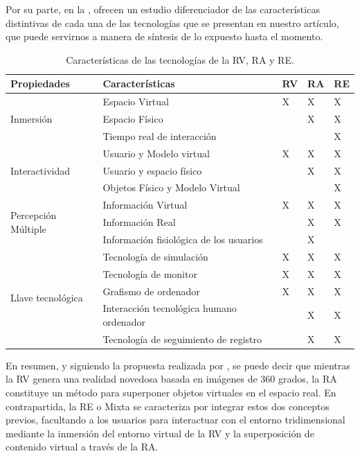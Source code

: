 \documentclass[spanish]{textolivre}
\begin{document}
Por su parte, en la , \textcite[p.~755]{ke2019enhanced} ofrecen un estudio diferenciador de las características distintivas de cada una de las tecnologías que se presentan en nuestro artículo, que puede servirnos a manera de síntesis de lo expuesto hasta el momento.

\begin{table}[htbp]
\caption{Características de las tecnologías de la RV, RA y RE.}
\label{tbl1}
\centering
\begin{tabular}{lllll}
\toprule
Propiedades & Características & RV & RA & RE \\ 
\midrule
\multirow{3}{*}{Inmersión} & Espacio Virtual & X & X & X \\ 
& Espacio Físico & & X & X \\
& Tiempo real de interacción & & & X \\
\multirow{3}{*}{Interactividad} & Usuario y Modelo virtual & X & X & X \\
& Usuario y espacio físico & & X & X \\
& Objetos Físico y Modelo Virtual & & & X \\
\multirow{3}{*}{Percepción Múltiple} & Información Virtual & X & X & X \\
& Información Real & & X & X \\
& Información fisiológica de los usuarios & & X \\
\multirow{5}{*}{Llave tecnológica} & Tecnología de simulación & X & X & X \\
& Tecnología de monitor & X & X & X \\
& Grafismo de ordenador & X & X & X \\
& Interacción tecnológica humano ordenador & & X & X \\
& Tecnología de seguimiento de registro & & X & X \\
\bottomrule
\end{tabular}
\end{table}

En resumen, y siguiendo la propuesta realizada por \textcite{park2022metaverse}, se puede decir que mientras la RV genera una realidad novedosa basada en imágenes de 360 grados, la RA constituye un método para superponer objetos virtuales en el espacio real. En contrapartida, la RE o Mixta se caracteriza por integrar estos dos conceptos previos, facultando a los usuarios para interactuar con el entorno tridimensional mediante la inmersión del entorno virtual de la RV y la superposición de contenido virtual a través de la RA.
\end{document}
